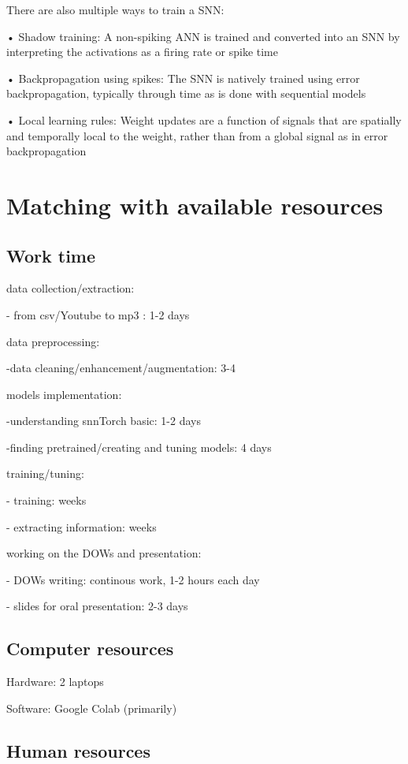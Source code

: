 \documentclass[11pt]{article}
\begin{document}
There are also multiple ways to train a SNN:

• Shadow training: A non-spiking ANN is trained and converted into an SNN by interpreting the activations as
a firing rate or spike time

• Backpropagation using spikes: The SNN is natively trained using error backpropagation, typically through
time as is done with sequential models

• Local learning rules: Weight updates are a function of signals that are spatially and temporally local to the
weight, rather than from a global signal as in error backpropagation



\section{Matching with available resources}
\subsection{Work time}

data collection/extraction:

- from csv/Youtube to mp3 : 1-2 days

data preprocessing:

-data cleaning/enhancement/augmentation: 3-4

models implementation:

-understanding snnTorch basic: 1-2 days

-finding pretrained/creating and tuning models: 4 days

training/tuning:

- training: weeks

- extracting information: weeks

working on the DOWs and presentation:

- DOWs writing: continous work, 1-2 hours each day

- slides for oral presentation: 2-3 days

\subsection{Computer resources}

Hardware: 2 laptops

Software: Google Colab (primarily)

\subsection{Human resources}
\end{document}
